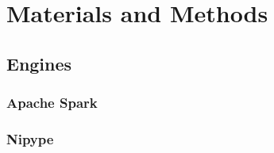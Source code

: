 \documentclass{IEEEtran}
\begin{document}







\section{Materials and Methods} %


\subsection{Engines} %

\subsubsection{Apache Spark}



\subsubsection{Nipype}

\end{document}
